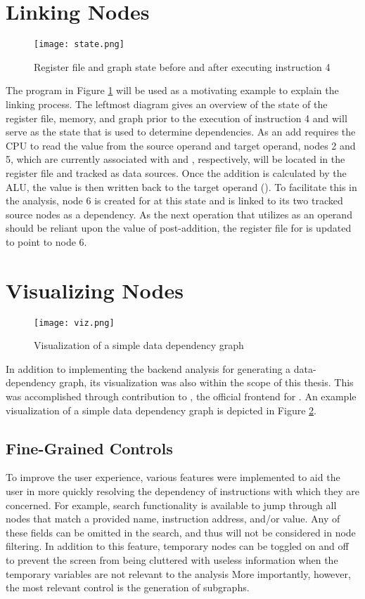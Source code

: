 \section{Linking Nodes}
\begin{figure}
    \centering
    \texttt{[image: state.png]}
    \caption{Register file and graph state before and after executing instruction 4}
    \label{fig:link}
\end{figure}
The program in Figure \ref{fig:link} will be used as a motivating example to explain the linking process. The leftmost diagram gives an overview of the state of the register file, memory, and graph prior to the execution of instruction 4 and will serve as the state that is used to determine dependencies. As an add requires the CPU to read the value from the source operand and target operand, nodes 2 and 5, which are currently associated with  and , respectively, will be located in the register file and tracked as data sources. Once the addition is calculated by the ALU, the value is then written back to the target operand (). To facilitate this in the analysis, node 6 is created for  at this state and is linked to its two tracked source nodes as a dependency. As the next operation that utilizes  as an operand should be reliant upon the value of  post-addition, the register file for  is updated to point to node 6.

\section{Visualizing Nodes}
\begin{figure}
    \centering
    \texttt{[image: viz.png]}
    \caption{Visualization of a simple data dependency graph}
    \label{fig:viz}
\end{figure}

In addition to implementing the backend analysis for generating a data-dependency graph, its visualization was also within the scope of this thesis. This was accomplished through contribution to , the official frontend for . An example visualization of a simple data dependency graph is depicted in Figure \ref{fig:viz}.

\subsection{Fine-Grained Controls}
To improve the user experience, various features were implemented to aid the user in more quickly resolving the dependency of instructions with which they are concerned. For example, search functionality is available to jump through all nodes that match a provided name, instruction address, and/or value. Any of these fields can be omitted in the search, and thus will not be considered in node filtering. In addition to this feature, temporary nodes can be toggled on and off to prevent the screen from being cluttered with useless information when the temporary variables are not relevant to the analysis More importantly, however, the most relevant control is the generation of subgraphs. 

